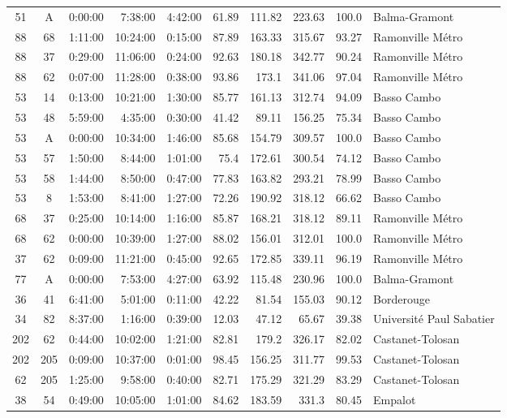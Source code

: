 \documentclass[twoside,12pt]{article}
\begin{document}
\begin{footnotesize}
\begin{longtable}{|c|c|r|r|r|r|r|r|r|l|}
	51	&	A	&	0:00:00	&	7:38:00	&	4:42:00	&	61.89	&	111.82	&	223.63	&	100.0	&	Balma-Gramont	\\
	88	&	68	&	1:11:00	&	10:24:00	&	0:15:00	&	87.89	&	163.33	&	315.67	&	93.27	&	Ramonville Métro	\\
	88	&	37	&	0:29:00	&	11:06:00	&	0:24:00	&	92.63	&	180.18	&	342.77	&	90.24	&	Ramonville Métro	\\
	88	&	62	&	0:07:00	&	11:28:00	&	0:38:00	&	93.86	&	173.1	&	341.06	&	97.04	&	Ramonville Métro	\\
	53	&	14	&	0:13:00	&	10:21:00	&	1:30:00	&	85.77	&	161.13	&	312.74	&	94.09	&	Basso Cambo	\\
	53	&	48	&	5:59:00	&	4:35:00	&	0:30:00	&	41.42	&	89.11	&	156.25	&	75.34	&	Basso Cambo	\\
	53	&	A	&	0:00:00	&	10:34:00	&	1:46:00	&	85.68	&	154.79	&	309.57	&	100.0	&	Basso Cambo	\\
	53	&	57	&	1:50:00	&	8:44:00	&	1:01:00	&	75.4	&	172.61	&	300.54	&	74.12	&	Basso Cambo	\\
	53	&	58	&	1:44:00	&	8:50:00	&	0:47:00	&	77.83	&	163.82	&	293.21	&	78.99	&	Basso Cambo	\\
	53	&	8	&	1:53:00	&	8:41:00	&	1:27:00	&	72.26	&	190.92	&	318.12	&	66.62	&	Basso Cambo	\\
	68	&	37	&	0:25:00	&	10:14:00	&	1:16:00	&	85.87	&	168.21	&	318.12	&	89.11	&	Ramonville Métro	\\
	68	&	62	&	0:00:00	&	10:39:00	&	1:27:00	&	88.02	&	156.01	&	312.01	&	100.0	&	Ramonville Métro	\\
	37	&	62	&	0:09:00	&	11:21:00	&	0:45:00	&	92.65	&	172.85	&	339.11	&	96.19	&	Ramonville Métro	\\
	77	&	A	&	0:00:00	&	7:53:00	&	4:27:00	&	63.92	&	115.48	&	230.96	&	100.0	&	Balma-Gramont	\\
	36	&	41	&	6:41:00	&	5:01:00	&	0:11:00	&	42.22	&	81.54	&	155.03	&	90.12	&	Borderouge	\\
	34	&	82	&	8:37:00	&	1:16:00	&	0:39:00	&	12.03	&	47.12	&	65.67	&	39.38	&	Université Paul Sabatier	\\
	202	&	62	&	0:44:00	&	10:02:00	&	1:21:00	&	82.81	&	179.2	&	326.17	&	82.02	&	Castanet-Tolosan	\\
	202	&	205	&	0:09:00	&	10:37:00	&	0:01:00	&	98.45	&	156.25	&	311.77	&	99.53	&	Castanet-Tolosan	\\
	62	&	205	&	1:25:00	&	9:58:00	&	0:40:00	&	82.71	&	175.29	&	321.29	&	83.29	&	Castanet-Tolosan	\\
	38	&	54	&	0:49:00	&	10:05:00	&	1:01:00	&	84.62	&	183.59	&	331.3	&	80.45	&	Empalot	\\

\end{longtable}
\end{footnotesize}
\end{document}

